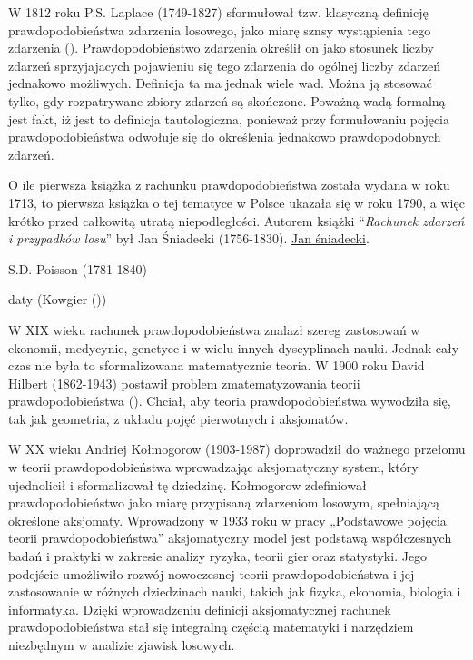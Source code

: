 \documentclass[
  letterpaper,
  DIV=11,
  numbers=noendperiod]{scrreprt}
\begin{document}
W 1812 roku P.S. Laplace (1749-1827) sformułował tzw. klasyczną
definicję prawdopodobieństwa zdarzenia losowego, jako miarę sznsy
wystąpienia tego zdarzenia (). Prawdopodobieństwo zdarzenia określił on jako stosunek liczby
zdarzeń sprzyjajacych pojawieniu się tego zdarzenia do ogólnej liczby
zdarzeń jednakowo możliwych. Definicja ta ma jednak wiele wad. Można ją
stosować tylko, gdy rozpatrywane zbiory zdarzeń są skończone. Poważną
wadą formalną jest fakt, iż jest to definicja tautologiczna, ponieważ
przy formułowaniu pojęcia prawdopodobieństwa odwołuje się do określenia
jednakowo prawdopodobnych zdarzeń.

O ile pierwsza książka z rachunku prawdopodobieństwa została wydana w
roku 1713, to pierwsza książka o tej tematyce w Polsce ukazała się w
roku 1790, a więc krótko przed całkowitą utratą niepodległości. Autorem
książki ``\emph{Rachunek zdarzeń i przypadków losu}'' był Jan Śniadecki
(1756-1830).
\href{https://pl.wikipedia.org/wiki/Jan_\%C5\%9Aniadecki}{Jan
śniadecki}.

S.D. Poisson (1781-1840)

daty (Kowgier ())

W XIX wieku rachunek prawdopodobieństwa znalazł szereg zastosowań w
ekonomii, medycynie, genetyce i w wielu innych dyscyplinach nauki.
Jednak cały czas nie była to sformalizowana matematycznie teoria. W 1900
roku David Hilbert (1862-1943) postawił problem zmatematyzowania teorii
prawdopodobieństwa (). Chciał, aby teoria prawdopodobieństwa wywodziła się, tak
jak geometria, z układu pojęć pierwotnych i aksjomatów.

W XX wieku Andriej Kołmogorow (1903-1987) doprowadził do ważnego
przełomu w teorii prawdopodobieństwa wprowadzając aksjomatyczny system,
który ujednolicił i sformalizował tę dziedzinę. Kołmogorow zdefiniował
prawdopodobieństwo jako miarę przypisaną zdarzeniom losowym, spełniającą
określone aksjomaty. Wprowadzony w 1933 roku w pracy „Podstawowe pojęcia
teorii prawdopodobieństwa'' aksjomatyczny model jest podstawą
współczesnych badań i praktyki w zakresie analizy ryzyka, teorii gier
oraz statystyki. Jego podejście umożliwiło rozwój nowoczesnej teorii
prawdopodobieństwa i jej zastosowanie w różnych dziedzinach nauki,
takich jak fizyka, ekonomia, biologia i informatyka. Dzięki wprowadzeniu
definicji aksjomatycznej rachunek prawdopodobieństwa stał się integralną
częścią matematyki i narzędziem niezbędnym w analizie zjawisk losowych.
\end{document}
